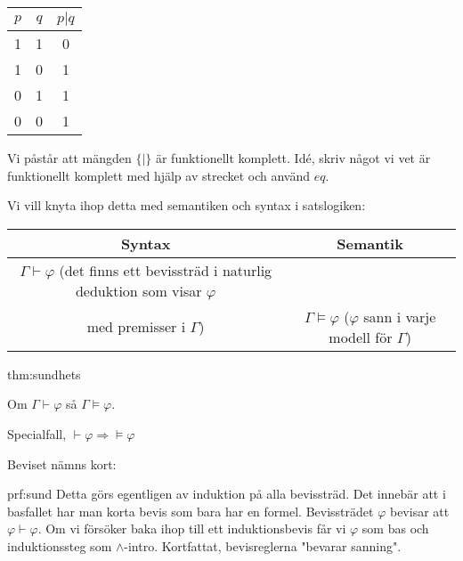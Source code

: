 \begin{center}
  \begin{tabular}{|c|c|c|}
    \hline
    $p$&$q$&$p|q$\\
    \hline
    1&1&0\\
    \hline
    1&0&1\\
    \hline
    0&1&1\\
    \hline
    0&0&1\\
    \hline
  \end{tabular}
\end{center}\par
\noindent Vi påstår att mängden $\{|\}$ är funktionellt komplett. Idé, skriv något vi vet är funktionellt komplett med hjälp av strecket och använd $eq$.
\par\bigskip
\noindent Vi vill knyta ihop detta med semantiken och syntax i satslogiken:

\begin{center}
  \begin{tabular}{|c|c|}
    \hline
    Syntax&Semantik\\
    \hline
    $\Gamma\vdash\varphi$ (det finns ett bevissträd i naturlig deduktion som visar $\varphi$\\ med premisser i $\Gamma$)&$\Gamma\vDash\varphi$ ($\varphi$ sann i varje modell för $\Gamma$)\\
    \hline
  \end{tabular}
\end{center}
\par\bigskip
\begin{theo}[Sundhetssatsen]{thm:sundhets}
  \begin{center}
    Om $\Gamma\vdash\varphi$ så $\Gamma\vDash\varphi$.\par
    \noindent Specialfall, $\vdash\varphi\Rightarrow\vDash\varphi$
  \end{center}
\end{theo}
\par\bigskip
\noindent Beviset nämns kort:
\par\bigskip
\begin{prf}[Sundhetssatsen]{prf:sund}
  Detta görs egentligen av induktion på alla bevissträd. Det innebär att i basfallet har man korta bevis som bara har en formel. Bevissträdet $\varphi$ bevisar att $\varphi\vdash\varphi$. Om vi försöker baka ihop till ett induktionsbevis får vi $\varphi$ som bas och induktionssteg som $\wedge$-intro. Kortfattat, bevisreglerna "bevarar sanning".
\end{prf}
\par\bigskip

